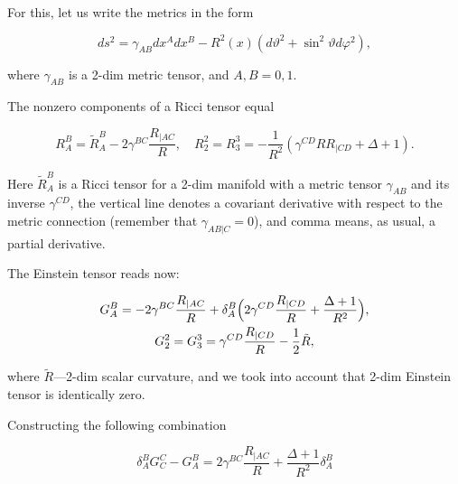 For this, let us write the metrics in the form

\begin{equation}

\label{dplus2}

ds^2 = \gamma_{AB} dx^A dx^B - R^2(x) (d \vartheta ^2 + \sin^2{\vartheta} d \varphi^2) ,

\end{equation}

where $\gamma_{AB}$ is a 2-dim metric tensor, and $A, B = 0, 1$. 

The nonzero components of a Ricci tensor equal

\begin{equation}

\label{Ricci2}

R^B_A = \tilde R^B_A - 2 \gamma^{BC} \frac{R_{|AC}}{R} , \quad 

R^2_2 = R^3_3 = - \frac{1}{R^2} \left(\gamma^{CD} R R_{|CD} + \Delta + 1 \right) .

\end{equation}

Here $\tilde R^B_A$ is a Ricci tensor for a 2-dim manifold with a metric tensor $\gamma_{AB}$ and its inverse $\gamma^{CD}$, the vertical line denotes a covariant derivative with respect to the metric connection (remember that $\gamma_{AB|C} = 0$), and comma means, as usual, a partial derivative. 

The Einstein tensor reads now:

\begin{gather}

\label{tein2}

G^B_A = - 2 \gamma^{BC} \frac{R_{|AC}}{R} + \delta^B_A \Bigl(2 \gamma^{CD} \frac{R_{|CD}}{R} + \frac{\Delta + 1}{R^2} \Bigr) , \\

G^2_2 = G^3_3 = \gamma^{CD} \frac{R_{|CD}}{R} - \frac{1}{2} \tilde R ,

\end{gather}

where $\tilde R$---2-dim scalar curvature, and we took into account that 2-dim Einstein tensor is identically zero. 

Constructing the following combination 

\begin{equation}

\label{comb}

\delta^B_A G^C_C - G^B_A = 2 \gamma^{BC} \frac{R_{|AC}}{R} + \frac{\Delta + 1}{R^2} \delta^B_A

\end{equation}

